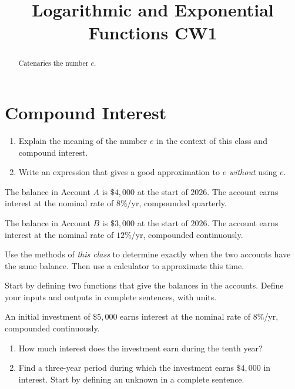 \documentclass{ximera}
\title{Logarithmic and Exponential Functions CW1}
\begin{document}
\begin{abstract}
Catenaries the number $e$.
\end{abstract}
\maketitle


\section{Compound Interest}

\begin{question} \label{QKf33r3rs}
\begin{enumerate}
\item Explain the meaning of the number $e$ in the context of this class and compound interest.

\item Write an expression that gives a good approximation to $e$ \emph{without} using $e$.

\end{enumerate}
\end{question}


\begin{question} \label{Qlerr33}
The balance in Account $A$ is $\$4,000$ at the start of $2026$. The account earns interest at the nominal rate of $8\%$/yr, compounded quarterly.

The balance in Account $B$ is $\$3,000$ at the start of $2026$. The account earns interest at the nominal rate of $12\%$/yr, compounded continuously.

Use the methods of \emph{this class} to determine exactly when the two accounts have the same balance. Then use a calculator to approximate this time.

Start by defining two functions that give the balances in the accounts. Define your inputs and outputs in complete sentences, with units.
\end{question}


\begin{question} \label{Qoero3r9030}
An initial investment of $\$5,000$ earns interest at the nominal rate of $8\%$/yr, compounded continuously.

\begin{enumerate}
\item How much interest does the investment earn during the tenth year?

\item Find a three-year period during which the investment earns $\$4,000$ in interest. Start by defining an unknown in a complete sentence.
\end{enumerate}
\end{question}
\end{document}
